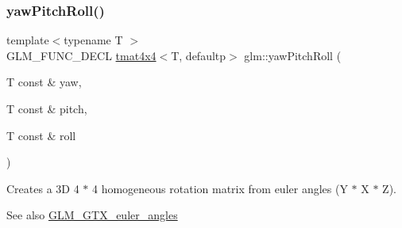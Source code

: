 \subsubsection{\texorpdfstring{yaw\+Pitch\+Roll()}{yawPitchRoll()}}
{\footnotesize\ttfamily template$<$typename T $>$ \\
G\+L\+M\+\_\+\+F\+U\+N\+C\+\_\+\+D\+E\+CL \hyperlink{structglm_1_1tmat4x4}{tmat4x4}$<$T, defaultp$>$ glm\+::yaw\+Pitch\+Roll (\begin{DoxyParamCaption}\item[{T const \&}]{yaw,  }\item[{T const \&}]{pitch,  }\item[{T const \&}]{roll }\end{DoxyParamCaption})}

Creates a 3D 4 $\ast$ 4 homogeneous rotation matrix from euler angles (Y $\ast$ X $\ast$ Z). \begin{DoxySeeAlso}{See also}
\hyperlink{group__gtx__euler__angles}{G\+L\+M\+\_\+\+G\+T\+X\+\_\+euler\+\_\+angles} 
\end{DoxySeeAlso}
